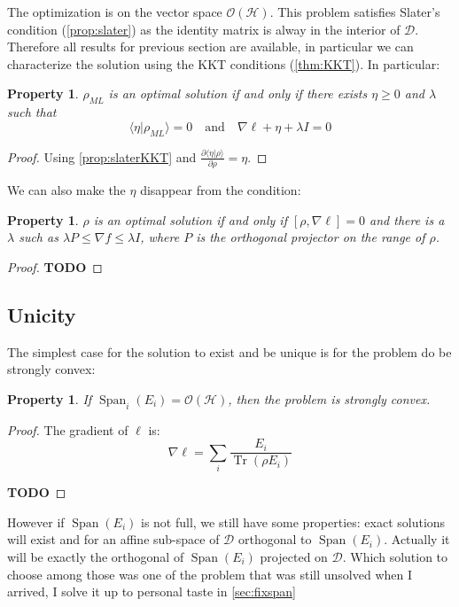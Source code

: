 \documentclass[10pt]{report}
\theoremstyle{plain}
\newtheorem{prop}[thm]{Property}
\theoremstyle{definition}
\theoremstyle{remark}
\newcommand{\TODO}{\textbf{TODO}}
\newcommand{\braket}[2]{\langle#1|#2\rangle}
\newcommand{\dpar}[2]{\frac{\partial{#1}}{\partial{#2}}}
\DeclareMathOperator{\Tr}{Tr}
\DeclareMathOperator{\Span}{Span}
\newcommand{\ml}{_{M\!L}}
\begin{document}
The optimization is on the vector space $\mathcal{O}(\mathcal{H})$. This problem
satisfies Slater's condition (\ref{prop:slater}) as the identity matrix is alway
in the interior of $\mathcal{D}$. Therefore all results for previous section are
available, in particular we can characterize the solution using the KKT
conditions (\ref{thm:KKT}). In particular:

\begin{prop}
  $\rho\ml$ is an optimal solution if and only if there
exists $\eta \ge 0$ and $\lambda$ such that
\[\braket \eta {\rho\ml} = 0 \quad \text{and} \quad \nabla \ell + \eta +
  \lambda I = 0\]
\end{prop}

\begin{proof}
  Using \cref{prop:slaterKKT} and $\displaystyle\dpar{\braket \eta \rho}\rho = \eta$.
\end{proof}


We can also make the $\eta$ disappear from the condition:
\begin{prop}
  $\rho$ is an optimal solution if and only if $[\rho, \nabla \ell] = 0$ and
  there is a $\lambda$ such as $\lambda P \le \nabla f \le \lambda I$, where $P$
  is the orthogonal projector on the range of $\rho$.
\end{prop}

\begin{proof}
  \TODO{}
\end{proof}

\subsection{Unicity}

The simplest case for the solution to exist and be unique is for the problem do
be strongly convex:

\begin{prop}
  If $\Span_i(E_i) = \mathcal{O}(\mathcal{H})$, then the problem is strongly convex.
\end{prop}

\begin{proof}
The gradient of $\ell$ is:
\begin{equation}
\nabla \ell = \sum_i \frac{E_i}{\Tr(\rho E_i)}
\end{equation}

  \TODO{}
\end{proof}

However if $\Span(E_i)$ is not full, we still have some properties: exact
solutions will exist and for an affine sub-space of $\mathcal{D}$ orthogonal to
$\Span(E_i)$. Actually it will be exactly the orthogonal of $\Span(E_i)$
projected on $\mathcal{D}$. Which solution to choose among those was one of the problem that
was still unsolved when I arrived, I solve it up to personal taste in \cref{sec:fixspan}
\end{document}
